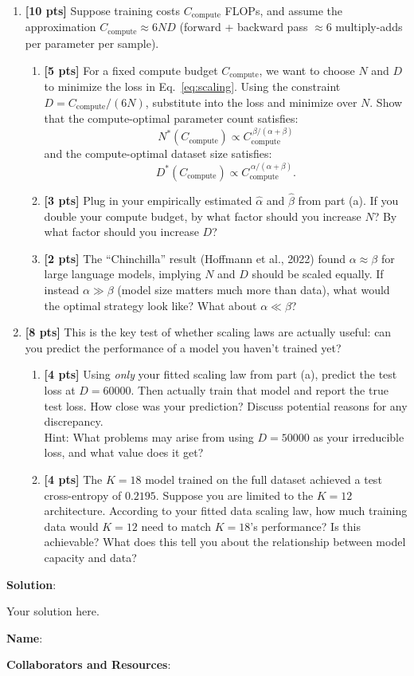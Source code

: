 \documentclass[submit]{../harvardml}
\newenvironment{solution}{
    \vspace{2mm}
    \color{blue}\noindent\textbf{Solution}:
}{}
\begin{document}
\begin{problem}
\begin{enumerate}[label=(\alph*)]
\item \textbf{[10 pts]} Suppose training costs $C_{\text{compute}}$ FLOPs, and assume the approximation $C_{\text{compute}} \approx 6ND$ (forward + backward pass $\approx 6$ multiply-adds per parameter per sample).
\begin{enumerate}[label=(\roman*)]
    \item \textbf{[5 pts]} For a fixed compute budget $C_{\text{compute}}$, we want to choose $N$ and $D$ to minimize the loss in Eq.~\eqref{eq:scaling}. Using the constraint $D = C_{\text{compute}} / (6N)$, substitute into the loss and minimize over $N$. Show that the compute-optimal parameter count satisfies:
    $$
    N^*(C_{\text{compute}}) \propto C_{\text{compute}}^{\,\beta / (\alpha + \beta)}
    $$
    and the compute-optimal dataset size satisfies:
    $$
    D^*(C_{\text{compute}}) \propto C_{\text{compute}}^{\,\alpha / (\alpha + \beta)}.
    $$
    \item \textbf{[3 pts]} Plug in your empirically estimated $\hat{\alpha}$ and $\hat{\beta}$ from part (a). If you double your compute budget, by what factor should you increase $N$? By what factor should you increase $D$?
    \item \textbf{[2 pts]} The ``Chinchilla'' result (Hoffmann et al., 2022) found $\alpha \approx \beta$ for large language models, implying $N$ and $D$ should be scaled equally. If instead $\alpha \gg \beta$ (model size matters much more than data), what would the optimal strategy look like? What about $\alpha \ll \beta$?
\end{enumerate}
\item \textbf{[8 pts]} This is the key test of whether scaling laws are actually useful: can you predict the performance of a model you haven't trained yet?
\begin{enumerate}[label=(\roman*)]
    \item \textbf{[4 pts]} Using \emph{only} your fitted scaling law from part (a), predict the test loss at $D = 60000$. Then actually train that model and report the true test loss.
    How close was your prediction? Discuss potential reasons for any discrepancy. \\
    Hint: What problems may arise from using $D=50000$ as your irreducible loss, and what value does it get?
    \item \textbf{[4 pts]} The $K=18$ model trained on the full dataset achieved a test cross-entropy of $0.2195$. Suppose you are limited to the $K=12$ architecture. According to your fitted data scaling law, how much training data would $K=12$ need to match $K=18$'s performance? Is this achievable? What does this tell you about the relationship between model capacity and data?
\end{enumerate}
\end{enumerate}

\end{problem}

\begin{solution}
	Your solution here.
\end{solution}


\newpage



\textbf{Name}:

\textbf{Collaborators and Resources}:
\end{document}
